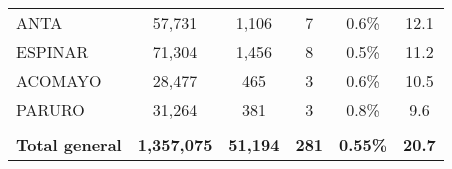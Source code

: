 \begin{tabular}{lccccc}
	\cellcolor[HTML]{FFFF99}ANTA                                    & 57,731               & 1,106                                & 7                    & 0.6\%                      & 12.1                                        \\
	\cellcolor[HTML]{FFFF99}ESPINAR                                 & 71,304               & 1,456                                & 8                    & 0.5\%                      & 11.2                                        \\
	\cellcolor[HTML]{FFFF99}ACOMAYO                                 & 28,477               & 465                                  & 3                    & 0.6\%                      & 10.5                                        \\
	\cellcolor[HTML]{FFFF99}PARURO                                  & 31,264               & 381                                  & 3                    & 0.8\%                      & 9.6                                         \\
	& \multicolumn{1}{l}{} & \multicolumn{1}{l}{}                 & \multicolumn{1}{l}{} & \multicolumn{1}{l}{}       & \multicolumn{1}{l}{}                        \\
	\rowcolor[HTML]{DDEBF7} 
	\textbf{Total general}                                          & \textbf{1,357,075}   & \textbf{51,194}                      & \textbf{281}         & \textbf{0.55\%}            & \textbf{20.7}                              
\end{tabular}